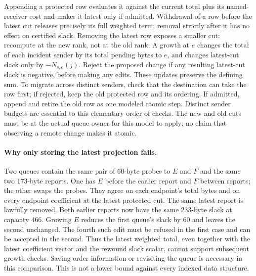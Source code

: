 \documentclass[11pt]{article}
\begin{document}
Appending a protected row evaluates it against the current total plus
its named-receiver cost and makes it latest only if admitted.
Withdrawal of a row before the latest cut releases precisely its full
weighted term; removal strictly after it has no effect on certified
slack. Removing the latest row exposes a smaller cut: recompute at
the new rank, not at the old rank. A growth at \(e\) changes the
total of each incident sender by its total pending bytes to \(e\),
and changes latest-cut slack only by \(-N_{s,e}(j)\). Reject the proposed
change if any resulting latest-cut slack is negative, before making
any edits. These updates preserve the defining sum. To migrate across
distinct senders, check that the destination can take the row first;
if rejected, keep the old protected row and its ordering. If admitted,
append and retire the old row as one modeled atomic step. Distinct
sender budgets are essential to this elementary order of checks. The
new and old cuts must be at the actual queue owner for this model to
apply; no claim that observing a remote change makes it atomic.

\paragraph{Why only storing the latest projection fails.}
Two queues contain the same pair of 60-byte probes to \(E\) and \(F\)
and the same two 173-byte reports. One has \(E\) before the earlier report
and \(F\) between reports; the other swaps the probes. They agree on
each endpoint's total bytes and on every endpoint coefficient at the
latest protected cut. The same latest report is lawfully removed.
Both earlier reports now have the same 233-byte slack at capacity 466.
Growing \(E\) reduces the first queue's slack by 60 and leaves the
second unchanged. The fourth such edit must be refused in the first
case and can be accepted in the second. Thus the latest weighted
total, even together with the latest coefficient vector and the
rewound slack scalar, cannot support subsequent growth checks.
Saving order information or revisiting the queue is necessary in this
comparison. This is not a lower bound against every indexed data structure.
\end{document}
